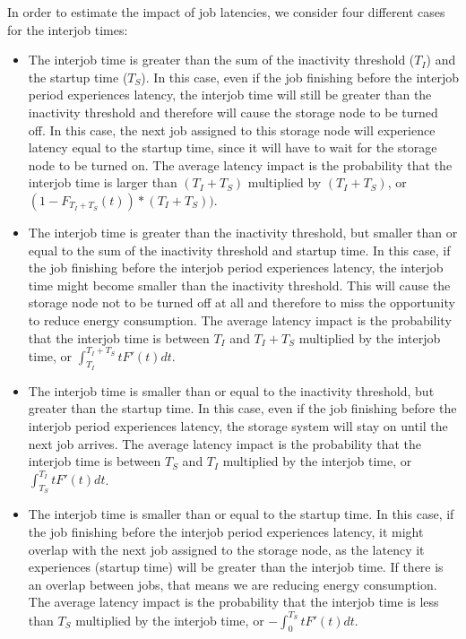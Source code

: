 In order to estimate the impact of job latencies,
we consider four different cases for the interjob
times:

\begin{itemize}
\item The interjob time
is greater than the sum of the inactivity threshold ($T_I$) and the
startup time ($T_S$).
In this case, even if the job finishing before the interjob period experiences
latency, the interjob time will still be greater than the inactivity threshold and
therefore will cause the storage node to be turned off. In this case,
the next job
assigned to this storage node will experience latency equal to the startup
time, since it will have to wait for the storage node to be turned
on. The average latency impact is the probability that the interjob time
is larger than $(T_I+T_S)$ multiplied by $(T_I+T_S)$, or
$(1-F_{T_I+T_S}(t))*(T_I+T_S))$.

\item The interjob time
is greater than the inactivity threshold, but smaller than or equal to the sum of
the inactivity threshold and startup time. In this case, if the job finishing
before the interjob period experiences latency, the interjob time might become smaller
than the inactivity threshold. This will cause the storage node not to be turned
off at all and therefore to miss the opportunity to reduce energy consumption.
The average latency impact is the probability that the interjob time
is between $T_I$ and $T_I+T_S$ multiplied by
the interjob time, or $\int_{T_I}^{T_I+T_S}tF'(t)dt$.

\item The interjob time is
smaller than or equal to the inactivity threshold, but greater than the startup time. In this
case, even if the job finishing before the interjob period experiences latency,
the storage system will stay on until the next job arrives.
The average latency impact is the probability that the interjob time
is between $T_S$ and $T_I$ multiplied by
the interjob time, or $\int_{T_S}^{T_I}tF'(t)dt$.

\item The interjob time
is smaller than or equal to the startup time. In this case, if the job
finishing before the interjob period experiences latency, it might overlap
with the next job assigned to the storage node, as the latency it experiences
(startup time) will be greater than the interjob time. If there is an overlap
between jobs, that means we are reducing energy consumption.
The average latency impact is the probability that the interjob time
is less than $T_S$ multiplied by
the interjob time, or $-\int_{0}^{T_S}tF'(t)dt$.
\end{itemize}  

